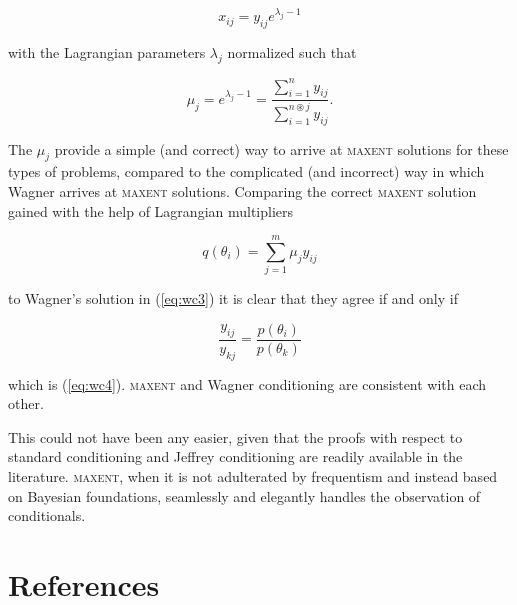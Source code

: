 \documentclass[11pt]{article}
\begin{document}
\begin{equation}
  \label{eq:wc5}
  x_{ij}=y_{ij}e^{\lambda_{j}-1}
\end{equation}

with the Lagrangian parameters $\lambda_{j}$ normalized such that

\begin{equation}
  \label{eq:wc6}
  \mu_{j}=e^{\lambda_{j}-1}=\frac{\sum_{i=1}^{n}y_{ij}}{\sum_{i=1}^{n\circledast{}j}y_{ij}}.
\end{equation}

The $\mu_{j}$ provide a simple (and correct) way to arrive at
\textsc{maxent} solutions for these types of problems, compared to the
complicated (and incorrect) way in which Wagner arrives at
\textsc{maxent} solutions. Comparing the correct \textsc{maxent}
solution gained with the help of Lagrangian multipliers

\begin{equation}
  \label{eq:wc7}
  q(\theta_{i})=\sum_{j=1}^{m}\mu_{j}y_{ij}
\end{equation}

to Wagner's solution in (\ref{eq:wc3}) it is clear that they agree if
and only if

\begin{equation}
  \label{eq:wc8}
  \frac{y_{ij}}{y_{kj}}=\frac{p(\theta_{i})}{p(\theta_{k})}
\end{equation}

which is (\ref{eq:wc4}). \textsc{maxent} and Wagner conditioning are
consistent with each other.

This could not have been any easier, given that the proofs with respect
to standard conditioning and Jeffrey conditioning are readily
available in the literature. \textsc{maxent}, when it is not
adulterated by frequentism and instead based on Bayesian foundations,
seamlessly and elegantly handles the observation of conditionals.

\section{References}
\label{References}

% 


\end{document}
